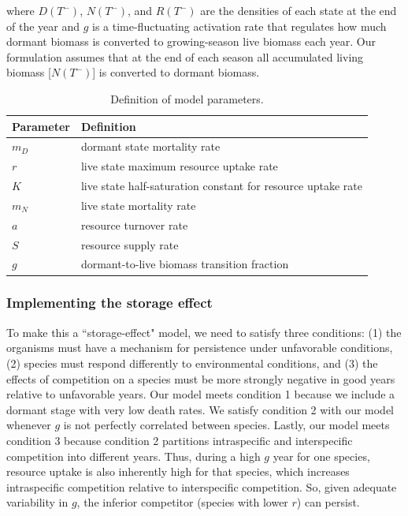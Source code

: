\documentclass[12pt,]{article}
\begin{document}
where $D(T^-)$, $N(T^-)$, and $R(T^-)$ are the densities of each state
at the end of the year and $g$ is a time-fluctuating activation rate
that regulates how much dormant biomass is converted to growing-season
live biomass each year. Our formulation assumes that at the end of each
season all accumulated living biomass {[}$N(T^-)${]} is converted to
dormant biomass.

\begin{center}
\begin{table}
\caption{Definition of model parameters.}
\begin{tabular}{l l}
\hline
Parameter & Definition \\
\hline
$m_{D}$ & dormant state mortality rate \\
$r$ & live state maximum resource uptake rate \\
$K$ & live state half-saturation constant for resource uptake rate \\
$m_{N}$ & live state mortality rate \\
$a$ & resource turnover rate \\
$S$ & resource supply rate \\
$g$ & dormant-to-live biomass transition fraction \\ 
\hline
\end{tabular}
\end{table}
\end{center}

\subsubsection{Implementing the storage
effect}\label{implementing-the-storage-effect}

To make this a ``storage-effect" model, we need to satisfy three
conditions: (1) the organisms must have a mechanism for persistence
under unfavorable conditions, (2) species must respond differently to
environmental conditions, and (3) the effects of competition on a
species must be more strongly negative in good years relative to
unfavorable years. Our model meets condition 1 because we include a
dormant stage with very low death rates. We satisfy condition 2 with our
model whenever $g$ is not perfectly correlated between species. Lastly,
our model meets condition 3 because condition 2 partitions intraspecific
and interspecific competition into different years. Thus, during a high
$g$ year for one species, resource uptake is also inherently high for
that species, which increases intraspecific competition relative to
interspecific competition. So, given adequate variability in $g$, the
inferior competitor (species with lower $r$) can persist.
\end{document}
